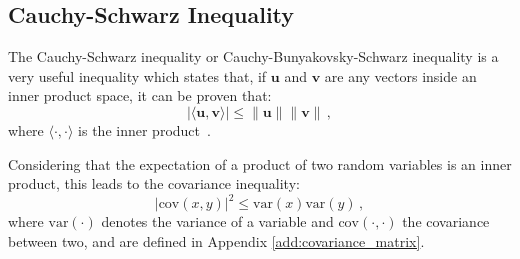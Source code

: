 \subsection{Cauchy-Schwarz Inequality} \label{add:cauchy_schwarz}
The Cauchy-Schwarz inequality or Cauchy-Bunyakovsky-Schwarz inequality is a very useful inequality which states that, if $\mathbf{u}$ and $\mathbf{v}$ are any vectors inside an inner product space, it can be proven that:
    \begin{equation*}
        |\langle \mathbf{u}, \mathbf{v} \rangle| \leq \|\mathbf{u}\|\|\mathbf{v}\|\,,
    \end{equation*}
where $\langle \cdot,\cdot \rangle$ is the inner product~\cite{strang2005linear}.

Considering that the expectation of a product of two random variables is an inner product, this leads to the covariance inequality:
    \begin{equation*}
        |\text{cov}(x,y)|^2 \leq \text{var}(x)\text{var}(y)\,,
    \end{equation*}
where $\text{var}(\cdot)$ denotes the variance of a variable and $\text{cov}(\cdot,\cdot)$ the covariance between two, and are defined in Appendix \ref{add:covariance_matrix}.